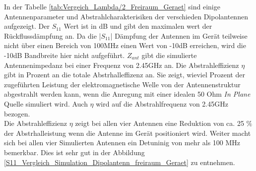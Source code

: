 In der Tabelle \ref{tab:Vergeich_Lambda/2_Freiraum_Geraet} sind einige Antennenparameter und Abstrahlcharakterisiken der verschieden Dipolantennen aufgezeigt. Der $S_{11}$ Wert ist in dB und gibt den maximalen wert der Rückflussdämpfung an. Da die |$S_{11}$| Dämpfung der Antennen im Gerät teilweise nicht über einen Bereich von 100MHz einen  Wert von -10dB erreichen, wird die -10dB Bandbreite hier nicht aufgeführt.
$Z_{ant}$ gibt die simulierte Antennenimpedanz bei einer Frequenz von 2.45GHz an.
Die Abstrahleffizienz $\eta$ gibt in Prozent an die totale Abstrhalleffizenz an. Sie zeigt, wieviel Prozent der zugeführten Leistung der elektromagnetische Welle von der Antennenstruktur abgestrahlt werden kann, wenn die Anregung mit einer idealen 50 Ohm \textit{In Plane} Quelle simuliert wird. Auch $\eta$ wird auf die Abstrahlfrequenz von 2.45GHz bezogen.\\
Die Abstrahleffizienz $\eta$ zeigt bei allen vier Antennen eine Reduktion von ca. 25 $\%$ der Abstrhalleistung wenn die Antenne im Gerät positioniert wird. Weiter macht sich bei allen vier Simulierten Antennen ein Detuninig von mehr als 100 MHz bemerkbar. Dies ist sehr gut in der Abbildung \ref{S11_Vergleich_Simulation_Dipolantenn_freiraum_Geraet} zu entnehmen. 



